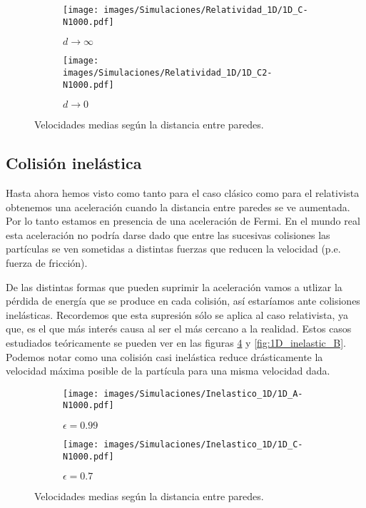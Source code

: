 \documentclass[11pt, spanish]{book}
\begin{document}
\begin{figure}[!h]
    \begin{subfigure}[b]{0.5\textwidth}
        \centering
        \texttt{[image: images/Simulaciones/Relatividad\_1D/1D\_C-N1000.pdf]}
        \caption{$d \rightarrow \infty$}
        \label{fig:relatividad_1D_C}
    \end{subfigure}
    \hfill
    \begin{subfigure}[b]{0.5\textwidth}
        \centering
        \texttt{[image: images/Simulaciones/Relatividad\_1D/1D\_C2-N1000.pdf]}
        \caption{$d \rightarrow 0$}
        \label{fig:relatividad_1D_C2}
    \end{subfigure}
    \caption{Velocidades medias según la distancia entre paredes.}
\end{figure}

\subsection{Colisión inelástica}

Hasta ahora hemos visto como tanto para el caso clásico como para el relativista obtenemos una aceleración cuando la distancia entre paredes se ve aumentada. Por lo tanto estamos en presencia de una aceleración de Fermi. En el mundo real esta aceleración no podría darse dado que entre las sucesivas colisiones las partículas se ven sometidas a distintas fuerzas que reducen la velocidad (p.e. fuerza de fricción). 

\vspace{3mm}

De las distintas formas que pueden suprimir la aceleración vamos a utlizar la pérdida de energía que se produce en cada colisión, así estaríamos ante colisiones inelásticas. Recordemos que esta supresión sólo se aplica al caso relativista, ya que, es el que más interés causa al ser el más cercano a la realidad. Estos casos estudiados teóricamente se pueden ver en las figuras \ref{fig:1D_inelastic_A} y \ref{fig:1D_inelastic_B}. Podemos notar como una colisión casi inelástica reduce drásticamente la velocidad máxima posible de la partícula para una misma velocidad dada.


\begin{figure}[H]
    \begin{subfigure}[b]{0.5\textwidth}
        \centering
        \texttt{[image: images/Simulaciones/Inelastico\_1D/1D\_A-N1000.pdf]}
        \caption{$\epsilon = 0.99$}
    \end{subfigure}
    \hfill
    \begin{subfigure}[b]{0.5\textwidth}
        \centering
        \texttt{[image: images/Simulaciones/Inelastico\_1D/1D\_C-N1000.pdf]}
        \caption{$\epsilon = 0.7$}
    \end{subfigure}
    \caption{Velocidades medias según la distancia entre paredes.}
    \label{fig:1D_inelastic_A}
\end{figure}
\end{document}
